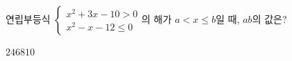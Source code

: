 \hspace*{2mm}\begin{minipage}[t]{\dimexpr\linewidth-2mm\relax}\vspace{0pt}
연립부등식 $\begin{cases} x^2+3x-10>0 \\ x^2-x-12\le 0 \end{cases}$의 해가 $a<x\le b$일 때, $ab$의 값은?
\begin{choices32}{$2$}{$4$}{$6$}{$8$}{$10$}\end{choices32}\end{minipage}
